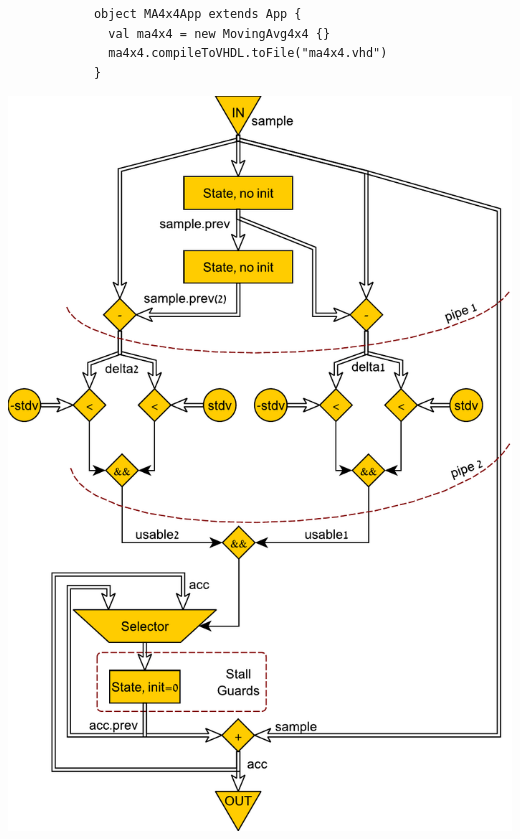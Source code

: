 \begin{table}[t!]
\begin{minipage}[t][23cm][t]{0.46\linewidth}
\begin{verbatim}
			object MA4x4App extends App {
			  val ma4x4 = new MovingAvg4x4 {}
			  ma4x4.compileToVHDL.toFile("ma4x4.vhd")
			}
    \end{verbatim}
    \label{fig:MADFiant}
    \vfill
    \includegraphics[width=\linewidth]{graphics/ma.pdf}
    \captionsetup{justification=centering}
		\label{fig:MADraw}
  \end{minipage}
  \hfill
  \begin{minipage}[t][23cm][t]{0.51\linewidth}
    \centering
    \captionsetup{justification=centering}

\end{minipage}
\end{table}
